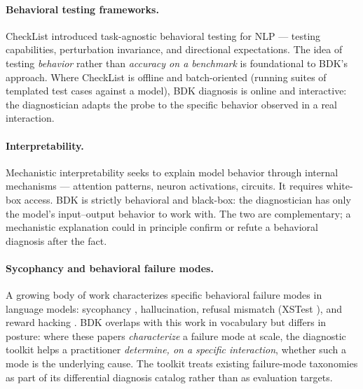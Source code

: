 \paragraph{Behavioral testing frameworks.}
CheckList \citep{ribeiro2020beyond} introduced task-agnostic behavioral
testing for NLP --- testing capabilities, perturbation invariance, and
directional expectations. The idea of testing \emph{behavior} rather
than \emph{accuracy on a benchmark} is foundational to BDK's
approach. Where CheckList is offline and batch-oriented (running suites
of templated test cases against a model), BDK diagnosis is online and
interactive: the diagnostician adapts the probe to the specific
behavior observed in a real interaction.

\paragraph{Interpretability.}
Mechanistic interpretability \citep{olah2020zoom, elhage2021mathematical}
seeks to explain model behavior through internal mechanisms ---
attention patterns, neuron activations, circuits. It requires
white-box access. BDK is strictly behavioral and black-box:
the diagnostician has only the model's input--output behavior to work
with. The two are complementary; a mechanistic explanation could in
principle confirm or refute a behavioral diagnosis after the fact.

\paragraph{Sycophancy and behavioral failure modes.}
A growing body of work characterizes specific behavioral failure modes
in language models: sycophancy \citep{sharma2023sycophancy,
perez2022discovering}, hallucination, refusal mismatch (XSTest
\citep{rottger2023xstest}), and reward hacking
\citep{lambert2024rewardbench}. BDK overlaps with this work
in vocabulary but differs in posture: where these papers
\emph{characterize} a failure mode at scale, the diagnostic toolkit
helps a practitioner \emph{determine, on a specific interaction},
whether such a mode is the underlying cause. The toolkit treats
existing failure-mode taxonomies as part of its differential diagnosis
catalog rather than as evaluation targets.

